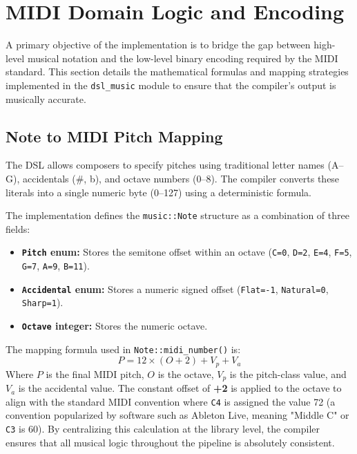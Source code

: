 \section{MIDI Domain Logic and Encoding}\label{sec:implementation-music-logic}

A primary objective of the implementation is to bridge the gap between high-level musical notation and the low-level binary encoding required by the MIDI standard.
This section details the mathematical formulas and mapping strategies implemented in the \texttt{dsl\_music} module to ensure that the compiler's output is musically accurate.

\subsection{Note to MIDI Pitch Mapping}

The DSL allows composers to specify pitches using traditional letter names (A--G), accidentals (\#, b), and octave numbers (0--8).
The compiler converts these literals into a single numeric byte (0--127) using a deterministic formula.

The implementation defines the \texttt{music::Note} structure as a combination of three fields:
\begin{itemize}
    \item \textbf{\texttt{Pitch} enum:} Stores the semitone offset within an octave (\texttt{C=0}, \texttt{D=2}, \texttt{E=4}, \texttt{F=5}, \texttt{G=7}, \texttt{A=9}, \texttt{B=11}).
    \item \textbf{\texttt{Accidental} enum:} Stores a numeric signed offset (\texttt{Flat=-1}, \texttt{Natural=0}, \texttt{Sharp=1}).
    \item \textbf{\texttt{Octave} integer:} Stores the numeric octave.
\end{itemize}

The mapping formula used in \texttt{Note::midi\_number()} is:
\begin{equation}
    P = 12 \times (O + 2) + V_p + V_a
\end{equation}
Where $P$ is the final MIDI pitch, $O$ is the octave, $V_p$ is the pitch-class value, and $V_a$ is the accidental value.
The constant offset of \textbf{+2} is applied to the octave to align with the standard MIDI convention where \texttt{C4} is assigned the value 72 (a convention popularized by software such as Ableton Live, meaning "Middle C" or \texttt{C3} is 60). By centralizing this calculation at the library level, the compiler ensures that all musical logic throughout the pipeline is absolutely consistent.

